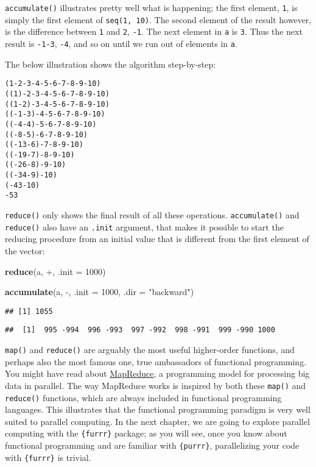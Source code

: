 \documentclass[
]{article}
\newenvironment{Shaded}{\begin{snugshade}}{\end{snugshade}}
\newcommand{\DataTypeTok}[1]{\textcolor[rgb]{0.13,0.29,0.53}{#1}}
\newcommand{\DecValTok}[1]{\textcolor[rgb]{0.00,0.00,0.81}{#1}}
\newcommand{\KeywordTok}[1]{\textcolor[rgb]{0.13,0.29,0.53}{\textbf{#1}}}
\newcommand{\NormalTok}[1]{#1}
\newcommand{\StringTok}[1]{\textcolor[rgb]{0.31,0.60,0.02}{#1}}
\begin{document}
\texttt{accumulate()} illustrates pretty well what is happening; the first element, \texttt{1}, is simply the
first element of \texttt{seq(1,\ 10)}. The second element of the result however, is the difference between
\texttt{1} and \texttt{2}, \texttt{-1}. The next element in \texttt{a} is \texttt{3}. Thus the next result is \texttt{-1-3}, \texttt{-4}, and so
on until we run out of elements in \texttt{a}.

The below illustration shows the algorithm step-by-step:

\begin{verbatim}
(1-2-3-4-5-6-7-8-9-10)
((1)-2-3-4-5-6-7-8-9-10)
((1-2)-3-4-5-6-7-8-9-10)
((-1-3)-4-5-6-7-8-9-10)
((-4-4)-5-6-7-8-9-10)
((-8-5)-6-7-8-9-10)
((-13-6)-7-8-9-10)
((-19-7)-8-9-10)
((-26-8)-9-10)
((-34-9)-10)
(-43-10)
-53
\end{verbatim}

\texttt{reduce()} only shows the final result of all these operations. \texttt{accumulate()} and \texttt{reduce()} also
have an \texttt{.init} argument, that makes it possible to start the reducing procedure from an initial
value that is different from the first element of the vector:

\begin{Shaded}
\begin{Highlighting}[]
\KeywordTok{reduce}\NormalTok{(a, }\StringTok{\textasciigrave{}}\DataTypeTok{+}\StringTok{\textasciigrave{}}\NormalTok{, }\DataTypeTok{.init =} \DecValTok{1000}\NormalTok{)}

\KeywordTok{accumulate}\NormalTok{(a, }\StringTok{\textasciigrave{}}\DataTypeTok{{-}}\StringTok{\textasciigrave{}}\NormalTok{, }\DataTypeTok{.init =} \DecValTok{1000}\NormalTok{, }\DataTypeTok{.dir =} \StringTok{"backward"}\NormalTok{)}
\end{Highlighting}
\end{Shaded}

\begin{verbatim}
## [1] 1055
\end{verbatim}

\begin{verbatim}
##  [1]  995 -994  996 -993  997 -992  998 -991  999 -990 1000
\end{verbatim}

\texttt{map()} and \texttt{reduce()} are arguably the most useful higher-order functions, and perhaps also the
most famous one, true ambassadors of functional programming. You might have read about
\href{https://en.wikipedia.org/wiki/MapReduce}{MapReduce}, a programming model for processing big
data in parallel. The way MapReduce works is inspired by both these \texttt{map()} and \texttt{reduce()} functions,
which are always included in functional programming languages. This illustrates that the functional
programming paradigm is very well suited to parallel computing. In the next chapter, we are going
to explore parallel computing with the \texttt{\{furrr\}} package; as you will see, once you know about
functional programming and are familiar with \texttt{\{purrr\}}, parallelizing your code with \texttt{\{furrr\}} is
trivial.
\end{document}
